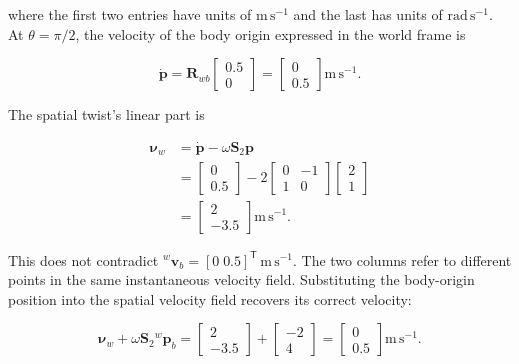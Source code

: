 \documentclass[
  australian,
  12pt,
  letterpaper,
  DIV=11,
  numbers=noendperiod,
  twoside]{scrreprt}
\begin{document}
where the first two entries have units of \(\mathrm{m\,s^{-1}}\) and the
last has units of \(\mathrm{rad\,s^{-1}}\). At \(\theta=\pi/2\), the
velocity of the body origin expressed in the world frame is

\[
\dot{\mathbf p}
=
\mathbf R_{wb}
\begin{bmatrix}
0.5\\0
\end{bmatrix}
=
\begin{bmatrix}
0\\0.5
\end{bmatrix}
\mathrm{m\,s^{-1}}.
\]

The spatial twist's linear part is

\[
\begin{aligned}
\boldsymbol\nu_w
&=
\dot{\mathbf p}
-
\omega\mathbf S_2\mathbf p\\
&=
\begin{bmatrix}
0\\0.5
\end{bmatrix}
-
2
\begin{bmatrix}
0&-1\\
1&0
\end{bmatrix}
\begin{bmatrix}
2\\1
\end{bmatrix}\\
&=
\begin{bmatrix}
2\\-3.5
\end{bmatrix}
\mathrm{m\,s^{-1}}.
\end{aligned}
\]

This does not contradict
\({}^w\mathbf v_b=[0\;0.5]^\mathsf T\,\mathrm{m\,s^{-1}}\). The two
columns refer to different points in the same instantaneous velocity
field. Substituting the body-origin position into the spatial velocity
field recovers its correct velocity:

\[
\boldsymbol\nu_w
+
\omega\mathbf S_2{}^w\mathbf p_b
=
\begin{bmatrix}
2\\-3.5
\end{bmatrix}
+
\begin{bmatrix}
-2\\4
\end{bmatrix}
=
\begin{bmatrix}
0\\0.5
\end{bmatrix}
\mathrm{m\,s^{-1}}.
\]
\end{document}
